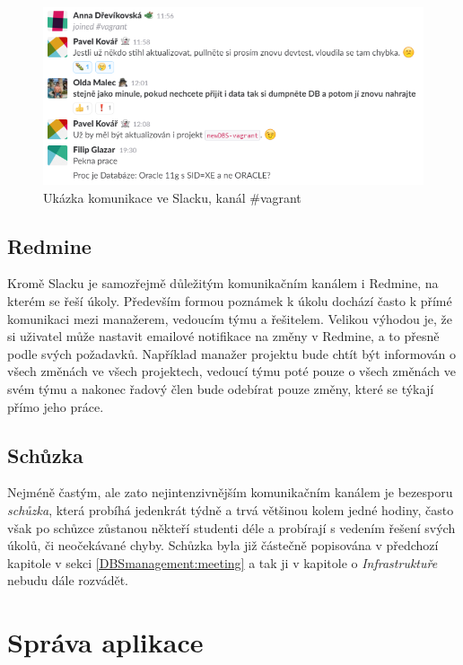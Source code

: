 \begin{figure}[h]
\includegraphics[width=\textwidth]{../png/slack.png}
\caption{Ukázka komunikace ve Slacku, kanál \#vagrant} \label{picture:slack}
\end{figure}

\subsection{Redmine}

Kromě Slacku je samozřejmě důležitým komunikačním kanálem i Redmine, na kterém se řeší úkoly. Především formou poznámek k úkolu dochází často k přímé komunikaci mezi manažerem, vedoucím týmu a řešitelem. Velikou výhodou je, že si uživatel může nastavit emailové notifikace na změny v Redmine, a to přesně podle svých požadavků. Například manažer projektu bude chtít být informován o všech změnách ve všech projektech, vedoucí týmu poté pouze o všech změnách ve svém týmu a nakonec řadový člen bude odebírat pouze změny, které se týkají přímo jeho práce.

\subsection{Schůzka}

Nejméně častým, ale zato nejintenzivnějším komunikačním kanálem je bezesporu \emph{schůzka}, která probíhá jedenkrát týdně a trvá většinou kolem jedné hodiny, často však po schůzce zůstanou někteří studenti déle a probírají s vedením řešení svých úkolů, či neočekávané chyby. Schůzka byla již částečně popisována v předchozí kapitole v sekci \ref{DBSmanagement:meeting} a tak ji v kapitole o \emph{Infrastruktuře} nebudu dále rozvádět.


\section{Správa aplikace}

